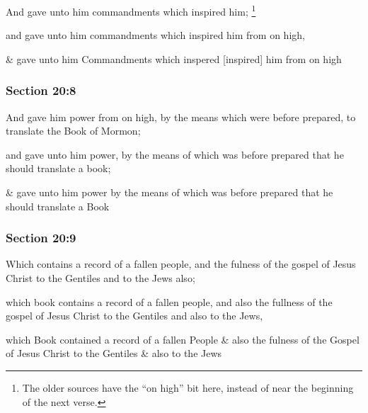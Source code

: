 		And gave unto him commandments which inspired him;%
			\footnote{%
				The older sources have the ``on high'' bit here, instead of near the beginning of the next verse.
				}

		\begin{framed}
		\scriptsize
			\begin{compactdesc}
				\item[JSP] and gave unto him commandments which inspired him from on high, 
				\item[RB1] \& gave unto him Commandments which inspered [inspired] him from on high
			\end{compactdesc}
		\end{framed}

	\subsubsection{Section 20:8} %
		\label{DC20-8}

		And gave him power from on high, by the means which were before prepared, to translate the Book of Mormon;

		\begin{framed}
		\scriptsize
			\begin{compactdesc}
				\item[JSP] and gave unto him power, by the means of which was before prepared that he should translate a book;
				\item[RB1] \& gave unto him power by the means of which was before prepared that he should translate a Book
			\end{compactdesc}
		\end{framed}

	\subsubsection{Section 20:9} %
		\label{DC20-9}

		Which contains a record of a fallen people, and the fulness of the gospel of Jesus Christ to the Gentiles and to the Jews also;

		\begin{framed}
		\scriptsize
			\begin{compactdesc}
				\item[JSP] which book contains a record of a fallen people, and also the fullness of the gospel of Jesus Christ to the Gentiles and also to the Jews,
				\item[RB1] which Book contained a record of a fallen People \& also the fulness of the Gospel of Jesus Christ to the Gentiles \& also to the Jews
			\end{compactdesc}
		\end{framed}

